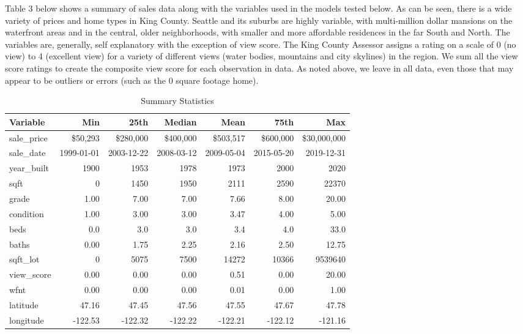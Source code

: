 \documentclass[colTwo]{format}
\theoremstyle{definition}
\begin{document}
Table 3 below shows a summary of sales data along with the variables used in the models tested below. As can be seen, there is a wide variety of prices and home types in King County.  Seattle and its suburbs are highly variable, with multi-million dollar mansions on the waterfront areas and in the central, older neighborhoods, with smaller and more affordable residences in the far South and North.  The variables are, generally, self explanatory with the exception of view score.  The King County Assessor assigns a rating on a scale of 0 (no view) to 4 (excellent view) for a variety of different views (water bodies, mountains and city skylines) in the region. We sum all the view score ratings to create the composite view score for each observation in data.  As noted above, we leave in all data, even those that may appear to be outliers or errors (such as the 0 square footage home). 

\begin{table*}[h!]
\centering
\begin{tabular}{l|r|r|r|r|r|r}
\hline
\textbf{Variable} & \textbf{Min} & \textbf{25th} & \textbf{Median} & \textbf{Mean} & \textbf{75th} & \textbf{Max}\\
\hline
sale\_price & \$50,293 & \$280,000 & \$400,000 & \$503,517 & \$600,000 & \$30,000,000\\
sale\_date & 1999-01-01 & 2003-12-22 & 2008-03-12 & 2009-05-04 & 2015-05-20 & 2019-12-31\\
year\_built & 1900 & 1953 & 1978 & 1973 & 2000 & 2020\\
sqft & 0 & 1450 & 1950 & 2111 & 2590 & 22370\\
grade & 1.00 & 7.00 & 7.00 & 7.66 & 8.00 & 20.00\\
condition & 1.00 & 3.00 & 3.00 & 3.47 & 4.00 & 5.00\\
beds & 0.0 & 3.0 & 3.0 & 3.4 & 4.0 & 33.0\\
baths & 0.00 & 1.75 & 2.25 & 2.16 & 2.50 & 12.75\\
sqft\_lot & 0 & 5075 & 7500 & 14272 & 10366 & 9539640\\
view\_score & 0.00 & 0.00 & 0.00 & 0.51 & 0.00 & 20.00\\
wfnt & 0.00 & 0.00 & 0.00 & 0.01 & 0.00 & 1.00\\
latitude & 47.16 & 47.45 & 47.56 & 47.55 & 47.67 & 47.78\\
longitude & -122.53 & -122.32 & -122.22 & -122.21 & -122.12 & -121.16\\
\hline
\end{tabular}
\caption{Summary Statistics}
\label{table:3}
\end{table*}
\end{document}

